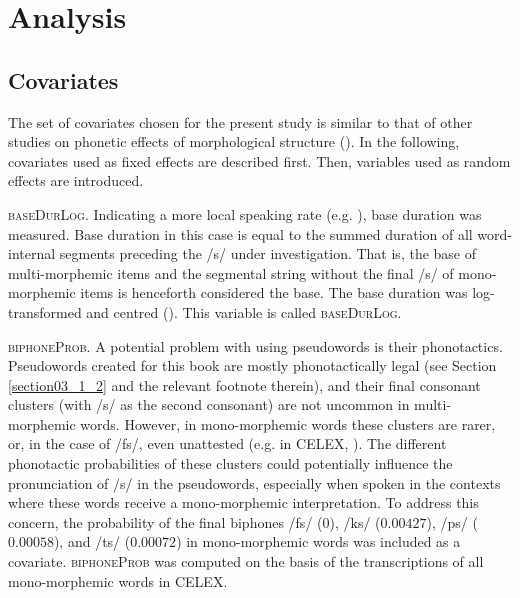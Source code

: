 \section{Analysis}\label{section04_2}

\subsection{Covariates}\label{section04_2_1}

The set of covariates chosen for the present study is similar to that of other studies on phonetic effects of morphological structure (\cite{Pluymaekers2005a, Pluymaekers2005b, Hanique2013Ernestus, Plag2017}). In the following, covariates used as fixed effects are described first. Then, variables used as random effects are introduced.

\textsc{baseDurLog}. Indicating a more local speaking rate (e.g. \cite{Plag2017}), base duration was measured. Base duration in this case is equal to the summed duration of all word-internal segments preceding the /s/ under investigation. That is, the base of multi-morphemic items and the segmental string without the final /s/ of mono-morphemic items is henceforth considered the base. The base duration was log-transformed and centred (\cite{Robinson2009, Afshartous2011, Winter2019}). This variable is called \textsc{baseDurLog}.

\textsc{biphoneProb}. A potential problem with using pseudowords is their phonotactics. Pseudowords created for this book are mostly phonotactically legal (see Section \ref{section03_1_2} and the relevant footnote therein), and their final consonant clusters (with /s/ as the second consonant) are not uncommon in multi-morphemic words. However, in mono-morphemic words these clusters are rarer, or, in the case of /fs/, even unattested (e.g. in CELEX, \cite{Baayen1995}). The different phonotactic probabilities of these clusters could potentially influence the pronunciation of /s/ in the pseudowords, especially when spoken in the contexts where these words receive a mono-morphemic interpretation. To address this concern, the probability of the final biphones /fs/ ($0$), /ks/ ($0.00427$), /ps/ ($0.00058$), and /ts/ ($0.00072$) in mono-morphemic words was included as a covariate. \textsc{biphoneProb} was computed on the basis of the transcriptions of all mono-morphemic words in CELEX.

